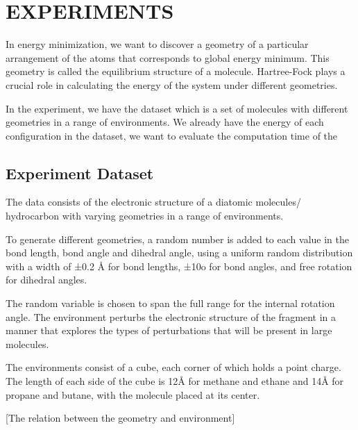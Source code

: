 \documentclass[twoside]{article}
\begin{document}
\section{EXPERIMENTS}

In energy minimization, we want to discover a geometry of a particular arrangement of the atoms that corresponds to global energy minimum. This geometry is called the equilibrium structure of a molecule.
Hartree-Fock plays a crucial role in calculating the energy of the system under different geometries. 

In the experiment, we have the dataset which is 
 a set of molecules with different geometries in a range of environments.
 We already have the energy of each configuration in the dataset, we want to evaluate the computation time of the 
 
 
\subsection{Experiment Dataset}

The data consists of the electronic structure of a diatomic molecules/ hydrocarbon with varying geometries in a range of environments. 

To generate different geometries,
a random number is added to each value in the bond length, bond angle and dihedral angle, using a uniform random distribution with a width of ±0.2 Å for bond lengths, ±10o for bond angles, and free rotation for dihedral angles. 

The random variable is chosen to span the full range for the internal rotation angle. The environment perturbs the electronic structure of the fragment in a manner that explores the types of perturbations that will be present in large molecules. 


The environments consist of a cube, each corner of which holds a point charge. The length of each side of the cube is 12Å for methane and ethane and 14Å for propane and butane, with the molecule placed at its center. 

[The relation between the geometry and environment]

\end{document}
